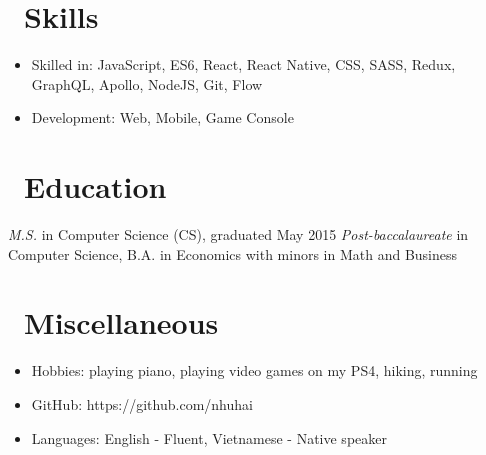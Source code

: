 \documentclass{resume}
\begin{document}

\section{\faCogs\ Skills}
\begin{itemize}[parsep=0.5ex]
  \item Skilled in: JavaScript, ES6, React, React Native, CSS, SASS, Redux, GraphQL, Apollo, NodeJS, Git, Flow
  \item Development: Web, Mobile, Game Console
\end{itemize}

\section{\faGraduationCap\ Education}
\textit{M.S.} in Computer Science (CS), graduated May 2015
\textit{Post-baccalaureate} in Computer Science, B.A. in Economics with minors in Math and Business

\section{\faInfo\ Miscellaneous}
\begin{itemize}[parsep=0.5ex]
  \item Hobbies: playing piano, playing video games on my PS4, hiking, running
  \item GitHub: https://github.com/nhuhai
  \item Languages: English - Fluent, Vietnamese - Native speaker
\end{itemize}

%
%
\end{document}
